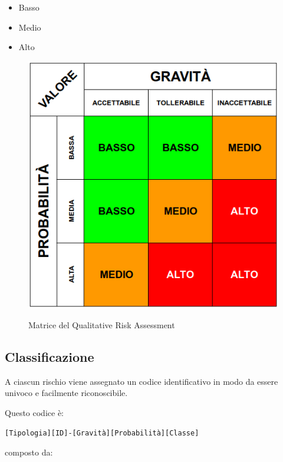 	\begin{itemize}
		\item Basso
		\item Medio
		\item Alto
	\end{itemize}

	\begin{figure}[H]
		\centering
		\includegraphics[scale=0.5]{img/risk_assessment_table.png}\\
		\caption{Matrice del Qualitative Risk Assessment}
		\label{fig:rischi}
	\end{figure}

	\subsection{Classificazione}

	A ciascun rischio viene assegnato un codice identificativo in modo da essere univoco e facilmente riconoscibile.

	Questo codice è:

	\begin{center}
		\texttt{[Tipologia][ID]-[Gravità][Probabilità][Classe]}
	\end{center}

	composto da:

